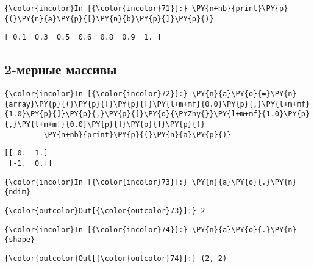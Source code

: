     \begin{Verbatim}[commandchars=\\\{\}]
{\color{incolor}In [{\color{incolor}71}]:} \PY{n+nb}{print}\PY{p}{(}\PY{n}{a}\PY{p}{[}\PY{n}{b}\PY{p}{]}\PY{p}{)}
\end{Verbatim}

    \begin{Verbatim}[commandchars=\\\{\}]
[ 0.1  0.3  0.5  0.6  0.8  0.9  1. ]

    \end{Verbatim}

\subsection{2-мерные массивы}
\label{numpy3}

    \begin{Verbatim}[commandchars=\\\{\}]
{\color{incolor}In [{\color{incolor}72}]:} \PY{n}{a}\PY{o}{=}\PY{n}{array}\PY{p}{(}\PY{p}{[}\PY{p}{[}\PY{l+m+mf}{0.0}\PY{p}{,}\PY{l+m+mf}{1.0}\PY{p}{]}\PY{p}{,}\PY{p}{[}\PY{o}{\PYZhy{}}\PY{l+m+mf}{1.0}\PY{p}{,}\PY{l+m+mf}{0.0}\PY{p}{]}\PY{p}{]}\PY{p}{)}
         \PY{n+nb}{print}\PY{p}{(}\PY{n}{a}\PY{p}{)}
\end{Verbatim}

    \begin{Verbatim}[commandchars=\\\{\}]
[[ 0.  1.]
 [-1.  0.]]

    \end{Verbatim}

    \begin{Verbatim}[commandchars=\\\{\}]
{\color{incolor}In [{\color{incolor}73}]:} \PY{n}{a}\PY{o}{.}\PY{n}{ndim}
\end{Verbatim}

            \begin{Verbatim}[commandchars=\\\{\}]
{\color{outcolor}Out[{\color{outcolor}73}]:} 2
\end{Verbatim}
        
    \begin{Verbatim}[commandchars=\\\{\}]
{\color{incolor}In [{\color{incolor}74}]:} \PY{n}{a}\PY{o}{.}\PY{n}{shape}
\end{Verbatim}

            \begin{Verbatim}[commandchars=\\\{\}]
{\color{outcolor}Out[{\color{outcolor}74}]:} (2, 2)
\end{Verbatim}
        
